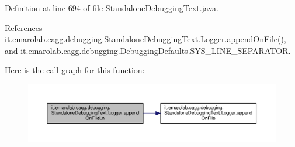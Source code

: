 Definition at line 694 of file Standalone\-Debugging\-Text.\-java.



References it.\-emarolab.\-cagg.\-debugging.\-Standalone\-Debugging\-Text.\-Logger.\-append\-On\-File(), and it.\-emarolab.\-cagg.\-debugging.\-Debugging\-Defaults.\-S\-Y\-S\-\_\-\-L\-I\-N\-E\-\_\-\-S\-E\-P\-A\-R\-A\-T\-O\-R.



Here is the call graph for this function\-:
\nopagebreak
\begin{figure}[H]
\begin{center}
\leavevmode
\includegraphics[width=350pt]{classit_1_1emarolab_1_1cagg_1_1debugging_1_1StandaloneDebuggingText_1_1Logger_a424d95a8940d0fbeebb76d9feae0e15f_cgraph}
\end{center}
\end{figure}


